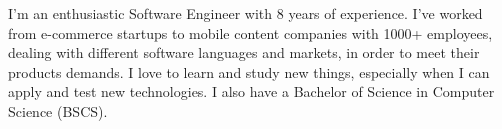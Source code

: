 %
%
%

\par{
	I'm an enthusiastic Software Engineer with 8 years of experience.
	I've worked from e-commerce startups to mobile content companies with 1000+ employees,
	dealing with different software languages and markets, in order to meet their products demands.
	I love to learn and study new things, especially when I can apply and test new technologies.
	I also have a Bachelor of Science in Computer Science (BSCS).\\
}
